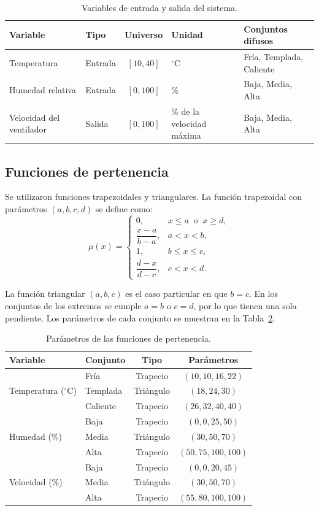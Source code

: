 \documentclass[11pt]{article}
\begin{document}
\begin{table}[h]
\centering
\caption{Variables de entrada y salida del sistema.}
\label{tab:variables}
\begin{tabular}{llcp{2.6cm}l}
\toprule
\textbf{Variable} & \textbf{Tipo} & \textbf{Universo} & \textbf{Unidad} & \textbf{Conjuntos difusos} \\
\midrule
Temperatura & Entrada & $[10, 40]$ & $^\circ$C & Fría, Templada, Caliente \\
Humedad relativa & Entrada & $[0, 100]$ & \% & Baja, Media, Alta \\
Velocidad del ventilador & Salida & $[0, 100]$ & \% de la velocidad máxima & Baja, Media, Alta \\
\bottomrule
\end{tabular}
\end{table}

\subsection{Funciones de pertenencia}

Se utilizaron funciones trapezoidales y triangulares. La función trapezoidal con parámetros $(a, b, c, d)$ se define como:
\[
\mu(x) =
\begin{cases}
0, & x \le a \ \text{ o } \ x \ge d, \\[4pt]
\dfrac{x - a}{b - a}, & a < x < b, \\[8pt]
1, & b \le x \le c, \\[4pt]
\dfrac{d - x}{d - c}, & c < x < d.
\end{cases}
\]

La función triangular $(a, b, c)$ es el caso particular en que $b = c$. En los conjuntos de los extremos se cumple $a = b$ o $c = d$, por lo que tienen una sola pendiente. Los parámetros de cada conjunto se muestran en la Tabla~\ref{tab:parametros}.

\begin{table}[h]
\centering
\caption{Parámetros de las funciones de pertenencia.}
\label{tab:parametros}
\begin{tabular}{llcc}
\toprule
\textbf{Variable} & \textbf{Conjunto} & \textbf{Tipo} & \textbf{Parámetros} \\
\midrule
\multirow{3}{*}{Temperatura ($^\circ$C)} & Fría & Trapecio & $(10, 10, 16, 22)$ \\
 & Templada & Triángulo & $(18, 24, 30)$ \\
 & Caliente & Trapecio & $(26, 32, 40, 40)$ \\
\midrule
\multirow{3}{*}{Humedad (\%)} & Baja & Trapecio & $(0, 0, 25, 50)$ \\
 & Media & Triángulo & $(30, 50, 70)$ \\
 & Alta & Trapecio & $(50, 75, 100, 100)$ \\
\midrule
\multirow{3}{*}{Velocidad (\%)} & Baja & Trapecio & $(0, 0, 20, 45)$ \\
 & Media & Triángulo & $(30, 50, 70)$ \\
 & Alta & Trapecio & $(55, 80, 100, 100)$ \\
\bottomrule
\end{tabular}
\end{table}
\end{document}
